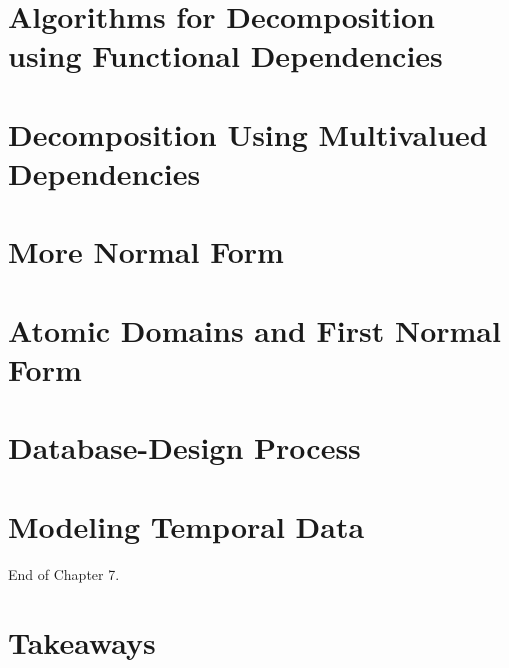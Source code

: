 \documentclass{beamer}
\begin{document}
\begin{frame}{}
\end{frame}

\section{Algorithms for Decomposition using Functional Dependencies}
\section{Decomposition Using Multivalued Dependencies}
\section{More Normal Form}
\section{Atomic Domains and First Normal Form}
\section{Database-Design Process}
\section{Modeling Temporal Data}


\begin{frame}{}
     \centering
     \Huge End of Chapter 7.
\end{frame}

\section*{Takeaways}
\end{document}
